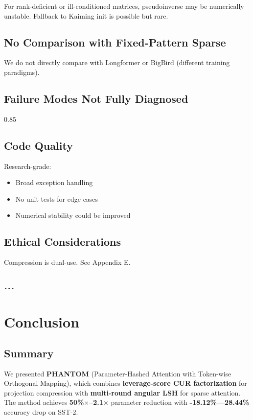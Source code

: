 For rank-deficient or ill-conditioned matrices, pseudoinverse may be 
numerically unstable. Fallback to Kaiming init is possible but rare.

\subsection{No Comparison with Fixed-Pattern Sparse}

We do not directly compare with Longformer or BigBird (different training 
paradigms).

\subsection{Failure Modes Not Fully Diagnosed}

0.85

\subsection{Code Quality}

Research-grade:
\begin{itemize}
\item Broad exception handling
\item No unit tests for edge cases
\item Numerical stability could be improved

\end{itemize}
\subsection{Ethical Considerations}

Compression is dual-use. See Appendix E.
\begin{lstlisting}

---
\end{lstlisting}


\section{Conclusion}

\subsection{Summary}

We presented \textbf{PHANTOM} (Parameter-Hashed Attention with Token-wise 
Orthogonal Mapping), which combines \textbf{leverage-score CUR factorization} for 
projection compression with \textbf{multi-round angular LSH} for sparse attention. 
The method achieves \textbf{50\%$\times$--2.1$\times$} parameter reduction with 
\textbf{-18.12\%---28.44\%} accuracy drop on SST-2.

